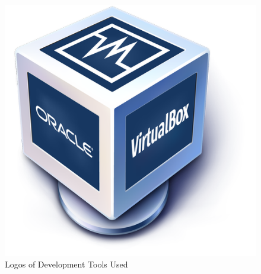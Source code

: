\begin{figure}[ht]
  \includegraphics[height=\developmentToolsLogosHeight]{assets/tools/development/virtualbox.png}
  \caption{Logos of Development Tools Used}
  \label{development_tools_logos}
\end{figure}



